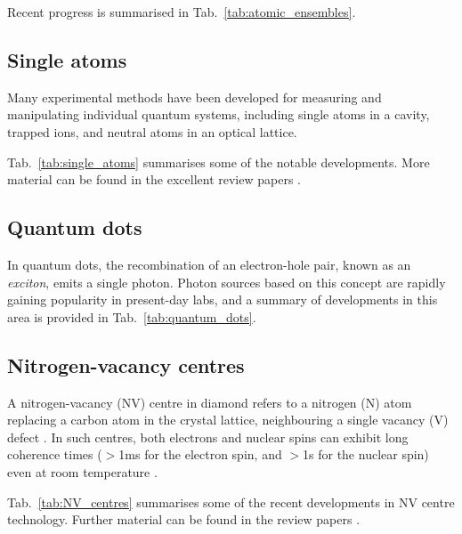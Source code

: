 Recent progress is summarised in Tab.~\ref{tab:atomic_ensembles}.

%
%

\subsection{Single atoms} 

Many experimental methods have been developed for measuring and manipulating individual quantum systems, including single atoms in a cavity, trapped ions, and neutral atoms in an optical lattice. 

Tab.~\ref{tab:single_atoms} summarises some of the notable developments. More material can be found in the excellent review papers \cite{bib:blatt2008entangled, bib:haroche2006exploring, bib:leibfried2003quantum}.

%
%

\subsection{Quantum dots} 

In quantum dots, the recombination of an electron-hole pair, known as an \textit{exciton}, emits a single photon. Photon sources based on this concept are rapidly gaining popularity in present-day labs, and a summary of developments in this area is provided in Tab.~\ref{tab:quantum_dots}.

%
%

\subsection{Nitrogen-vacancy centres} 

A nitrogen-vacancy (NV) centre in diamond refers to a nitrogen (N) atom replacing a carbon atom in the crystal lattice, neighbouring a single vacancy (V) defect \cite{bib:doherty2013nitrogen}. In such centres, both electrons and nuclear spins can exhibit long coherence times ($>$1ms for the electron spin, and $>$1s for the nuclear spin) even at room temperature \cite{bib:balasubramanian2009ultralong, bib:neumann2010quantum, bib:maurer2012room}.

Tab.~\ref{tab:NV_centres} summarises some of the recent developments in NV centre technology. Further material can be found in the review papers \cite{bib:doherty2013nitrogen, bib:atature2018material, bib:awschalom2018quantum}.

